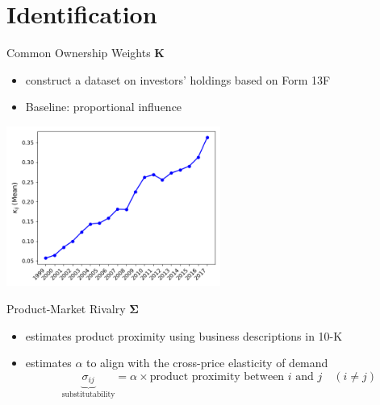 \documentclass[
  10pt,
  aspectratio=169,   %
]{beamer}
\theoremstyle{plain}
\begin{document}
\section{Identification}

\begin{frame}{Common Ownership Weights $\bm{K}$}
  \begin{itemize}
    \item \citet{Backus2021-yt} construct a dataset on investors' holdings based on Form 13F
    \item Baseline: proportional influence \citep{Rotemberg1984-jz} \hfill\hyperlink{rotemberg}{}
  \end{itemize}
  \begin{center}
    \includegraphics[width=7cm]{figures/kappa}
  \end{center}
\end{frame}

\begin{frame}{Product-Market Rivalry $\bm{\Sigma}$}

  \begin{itemize}
    \item \label{product_identification} \citet{Hoberg2016-jm} estimates product proximity using business descriptions in 10-K
          \medskip{}
    \item \citet{Pellegrino2024-dn} estimates $\alpha$ to align with the cross-price
          elasticity of demand
          \medskip{}
          \[
            \underbrace{\sigma_{ij}}_{\text{substitutability}}=\alpha\times\text{product proximity between }i\text{ and }j\quad\left(i\neq j\right)
          \]\hyperlink{micro_vs_ghl}{}
  \end{itemize}

\end{frame}
\end{document}
